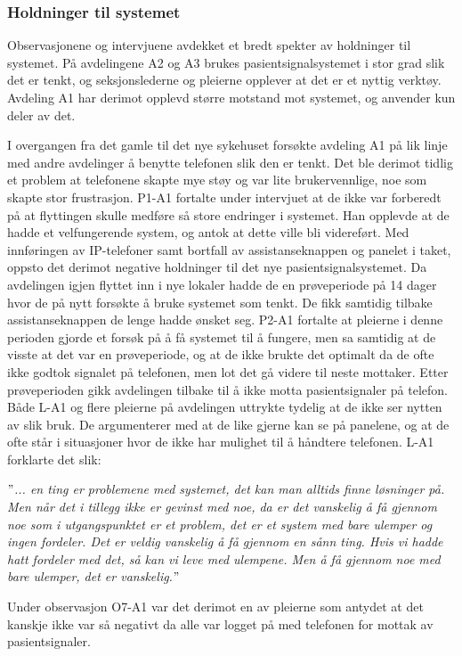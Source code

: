 \subsubsection{Holdninger til systemet}
Observasjonene og intervjuene avdekket et bredt spekter av holdninger til systemet. På avdelingene A2 og A3 brukes pasientsignalsystemet i stor grad slik det er tenkt, og seksjonslederne og pleierne opplever at det er et nyttig verktøy. Avdeling A1 har derimot opplevd større motstand mot systemet, og anvender kun deler av det.

\noindent
I overgangen fra det gamle til det nye sykehuset forsøkte avdeling A1 på lik linje med andre avdelinger å benytte telefonen slik den er tenkt. Det ble derimot tidlig et problem at telefonene skapte mye støy og var lite brukervennlige, noe som skapte stor frustrasjon. P1-A1 fortalte under intervjuet at de ikke var forberedt på at flyttingen skulle medføre så store endringer i systemet. Han opplevde at de hadde et velfungerende system, og antok at dette ville bli videreført. Med innføringen av IP-telefoner samt bortfall av assistanseknappen og panelet i taket, oppsto det derimot negative holdninger til det nye pasientsignalsystemet. Da avdelingen igjen flyttet inn i nye lokaler hadde de en prøveperiode på 14 dager hvor de på nytt forsøkte å bruke systemet som tenkt. De fikk samtidig tilbake assistanseknappen de lenge hadde ønsket seg. P2-A1 fortalte at pleierne i denne perioden gjorde et forsøk på å få systemet til å fungere, men sa samtidig at de visste at det var en prøveperiode, og at de ikke brukte det optimalt da de ofte ikke godtok signalet på telefonen, men lot det gå videre til neste mottaker. Etter prøveperioden gikk avdelingen tilbake til å ikke motta pasientsignaler på telefon. Både L-A1 og flere pleierne på avdelingen uttrykte tydelig at de ikke ser nytten av slik bruk. De argumenterer med at de like gjerne kan se på panelene, og at de ofte står i situasjoner hvor de ikke har mulighet til å håndtere telefonen. L-A1 forklarte det slik: 

\noindent
\textit{$"$... en ting er problemene med systemet, det kan man alltids finne løsninger på. Men når det i tillegg ikke er gevinst med noe, da er det vanskelig å få gjennom noe som i utgangspunktet er et problem, det er et system med bare ulemper og ingen fordeler. Det er veldig vanskelig å få gjennom en sånn ting. Hvis vi hadde hatt fordeler med det, så kan vi leve med ulempene. Men å få gjennom noe med bare ulemper, det er vanskelig.$"$}

\noindent
Under observasjon O7-A1 var det derimot en av pleierne som antydet at det kanskje ikke var så negativt da alle var logget på med telefonen for mottak av pasientsignaler.

